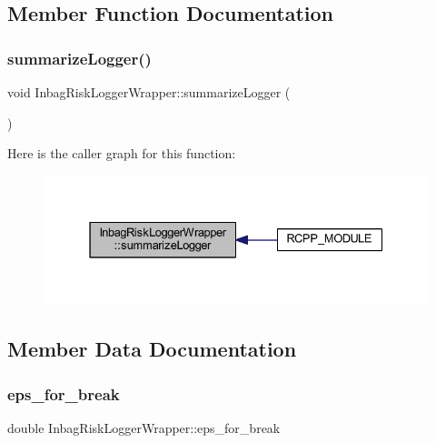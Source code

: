 \subsection{Member Function Documentation}
\mbox{\label{class_inbag_risk_logger_wrapper_ad6c58bd912b715cd6ef3a82573f4b142}} 
\subsubsection{\texorpdfstring{summarize\+Logger()}{summarizeLogger()}}
{\footnotesize\ttfamily void Inbag\+Risk\+Logger\+Wrapper\+::summarize\+Logger (\begin{DoxyParamCaption}{ }\end{DoxyParamCaption})\hspace{0.3cm}{\ttfamily [inline]}}

Here is the caller graph for this function\+:\nopagebreak
\begin{figure}[H]
\begin{center}
\leavevmode
\includegraphics[width=331pt]{class_inbag_risk_logger_wrapper_ad6c58bd912b715cd6ef3a82573f4b142_icgraph}
\end{center}
\end{figure}


\subsection{Member Data Documentation}
\mbox{\label{class_inbag_risk_logger_wrapper_ae1731a184b5cae28fd5981ffd6daeec7}} 
\subsubsection{\texorpdfstring{eps\+\_\+for\+\_\+break}{eps\_for\_break}}
{\footnotesize\ttfamily double Inbag\+Risk\+Logger\+Wrapper\+::eps\+\_\+for\+\_\+break\hspace{0.3cm}{\ttfamily [private]}}

